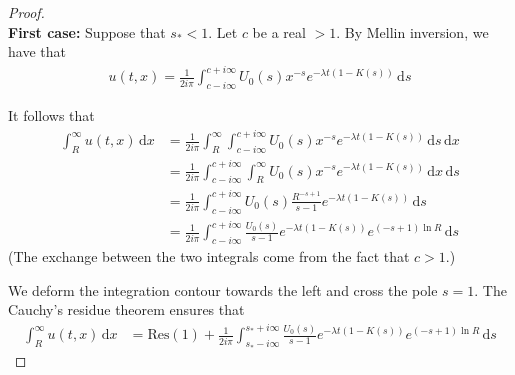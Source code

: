 \documentclass[11pt]{amsart}
\newcommand{\diff}{\,\mathrm{d}}
\begin{document}
\begin{proof}\text{}\\

\textbf{First case:} Suppose that $s_* < 1$. Let $c$ be a real $>1$. 
By Mellin inversion, we have that
\begin{align*}
    u(t,x) = \frac{1}{2i\pi}\int_{c-i\infty}^{c+i\infty} U_0(s) x^{-s} e^{-\lambda t(1 - K(s))} \diff s
\end{align*}

It follows that
\begin{align*}
    \int_R^\infty u(t,x) \diff x 
    &= \frac{1}{2i\pi} \int_R^\infty \int_{c-i\infty}^{c+i\infty} U_0(s) x^{-s} e^{-\lambda t(1 - K(s))} \diff s \diff x \\
    &= \frac{1}{2i\pi} \int_{c-i\infty}^{c+i\infty} \int_R^\infty U_0(s) x^{-s} e^{-\lambda t(1 - K(s))} \diff x \diff s \\
    &= \frac{1}{2i\pi} \int_{c-i\infty}^{c+i\infty} U_0(s) \frac{R^{-s+1}}{s-1} e^{-\lambda t(1 - K(s))} \diff s \\
    &= \frac{1}{2i\pi} \int_{c-i\infty}^{c+i\infty}\frac{U_0(s)}{s-1} e^{-\lambda t(1 - K(s))} e^{(-s+1)\ln R} \diff s 
\end{align*}
(The exchange between the two integrals come from the fact that $c > 1$.)

We deform the integration contour towards the left and cross the pole $s = 1$. The Cauchy's residue theorem ensures that
\begin{align}
    \int_R^\infty u(t,x) \diff x &= \mathrm{Res(1)} + \frac{1}{2i\pi} \int_{s_*-i\infty}^{s_*+i\infty} \frac{U_0(s)}{s-1} e^{-\lambda t(1 - K(s))} e^{(-s+1)\ln R} \diff s
    \label{eq:cauchy1}
\end{align}


\end{proof}
\end{document}
